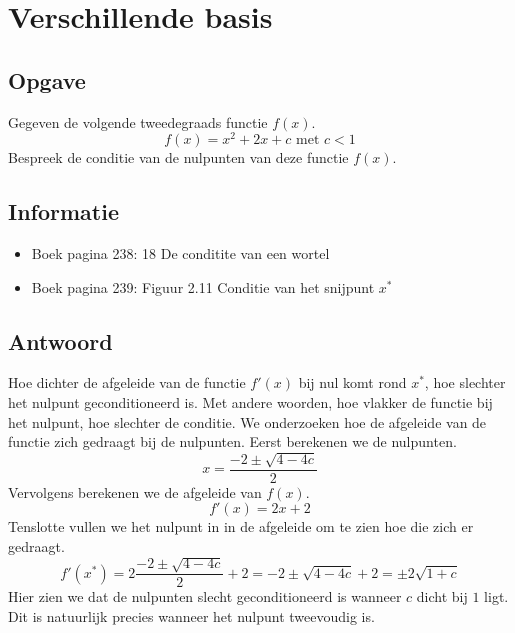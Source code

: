 \documentclass[examenvragen.tex]{subfiles}
\begin{document}
\section{Verschillende basis}

\subsection{Opgave}
Gegeven de volgende tweedegraads functie $f(x)$.
\[
f(x) = x^{2} + 2x + c \text{ met } c < 1
\]
Bespreek de conditie van de nulpunten van deze functie $f(x)$.

\subsection{Informatie}
\begin{itemize}
\item Boek pagina 238: 18 De conditite van een wortel
\item Boek pagina 239: Figuur 2.11 Conditie van het snijpunt $x^{*}$
\end{itemize}

\subsection{Antwoord}
Hoe dichter de afgeleide van de functie $f'(x)$ bij nul komt rond $x^{*}$, hoe slechter het nulpunt geconditioneerd is. Met andere woorden, hoe vlakker de functie bij het nulpunt, hoe slechter de conditie.
We onderzoeken hoe de afgeleide van de functie zich gedraagt bij de nulpunten.
Eerst berekenen we de nulpunten.
\[
x = \frac{-2 \pm \sqrt{4-4c}}{2}
\]
Vervolgens berekenen we de afgeleide van $f(x)$.
\[
f'(x) = 2x+2
\]
Tenslotte vullen we het nulpunt in in de afgeleide om te zien hoe die zich er gedraagt.
\[
f'(x^*) = 2 \frac{-2 \pm \sqrt{4-4c}}{2} + 2 = -2 \pm \sqrt{4-4c} + 2 = \pm 2\sqrt{1+c}
\]
Hier zien we dat de nulpunten slecht geconditioneerd is wanneer $c$ dicht bij $1$ ligt. Dit is natuurlijk precies wanneer het nulpunt tweevoudig is.
\end{document}
